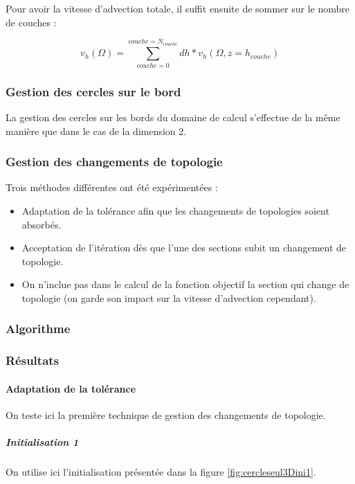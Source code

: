 \documentclass[11pt,a4paper]{article}
\begin{document}
	Pour avoir la vitesse d'advection totale, il suffit ensuite de sommer sur le nombre de couches :
	
	\begin{equation}
	v_h(\Omega)=\sum_{couche=0}^{couche=N_{couche}}dh*v_h(\Omega,z=h_{couche})
	\end{equation}

\subsubsection{Gestion des cercles sur le bord}

La gestion des cercles sur les bords du domaine de calcul s'effectue de la même manière que dans le cas de la dimension 2. 

\subsubsection{Gestion des changements de topologie}
 Trois méthodes différentes ont été expérimentées :
 \begin{itemize}
 	\item Adaptation de la tolérance afin que les changements de topologies soient absorbés.
 	\item Acceptation de l'itération dès que l'une des sections subit un changement de topologie.
 	\item On n'inclue pas dans le calcul de la fonction objectif la section qui change de topologie (on garde son impact sur la vitesse d'advection cependant).
 \end{itemize}
 
\subsubsection{Algorithme}

\subsubsection{Résultats}

\paragraph{Adaptation de la tolérance}
On teste ici la première technique de gestion des changements de topologie.

\subparagraph{Initialisation 1} On utilise ici l'initialisation présentée dans la figure \ref{fig:cercleseul3Dini1}.
\end{document}
